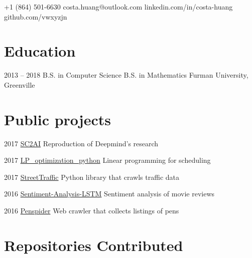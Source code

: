 \documentclass{tccv}
\begin{document}
    {+1 (864) 501-6630}
    {costa.huang@outlook.com}
    {linkedin.com/in/costa-huang}
    {github.com/vwxyzjn}

\section{Education}

\begin{yearlist}

\item{2013 -- 2018}
     {B.S. in Computer Science \newline B.S. in Mathematics}
     {Furman University, Greenville}

\end{yearlist}

\section{Public projects}

\begin{yearlist}

\item{2017}
     {\href{https://costahuang.me/SC2AI/}{SC2AI}}
     {Reproduction of Deepmind's research}

\item{2017}
     {\href{https://costahuang.me/LP_optimization_python/}{LP\_optimization\_python}}
     {Linear programming for scheduling}

\item{2017}
     {\href{https://streettraffic.org/}{StreetTraffic}}
     {Python library that crawls traffic data}

\item{2016}
     {\href{https://costahuang.me/Sentiment-Analysis-LSTM/}{Sentiment-Analysis-LSTM}}
     {Sentiment analysis of movie reviews}

\item{2016}
     {\href{https://github.com/vwxyzjn/penspider}{Penspider}}
     {Web crawler that collects listings of pens }

\end{yearlist}

\section{Repositories Contributed}
\end{document}

